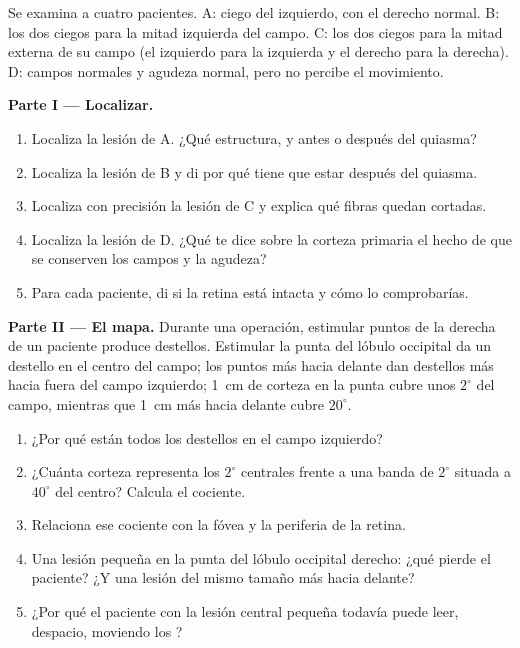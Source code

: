 \begin{problem}
\label{pb:g11:vision-and-brain:1}
Se examina a cuatro pacientes. A: ciego del  izquierdo, con el
derecho normal. B: los dos  ciegos para la mitad izquierda del
campo. C: los dos  ciegos para la mitad externa de su campo (el 
izquierdo para la izquierda y el derecho para la derecha). D: campos
normales y agudeza normal, pero no percibe el movimiento.

\medskip
\noindent\textbf{Parte I --- Localizar.}
\begin{enumerate}
  \item Localiza la lesión de A. ¿Qué estructura, y antes o después del
        quiasma?
  \item Localiza la lesión de B y di por qué tiene que estar después
        del quiasma.
  \item Localiza con precisión la lesión de C y explica qué fibras
        quedan cortadas.
  \item Localiza la lesión de D. ¿Qué te dice sobre la corteza primaria
        el hecho de que se conserven los campos y la agudeza?
  \item Para cada paciente, di si la retina está intacta y cómo lo
        comprobarías.
\end{enumerate}

\medskip
\noindent\textbf{Parte II --- El mapa.}
Durante una operación, estimular puntos de la  derecha de
un paciente produce destellos. Estimular la punta del lóbulo occipital
da un destello en el centro del campo; los puntos más hacia delante dan
destellos más hacia fuera del campo izquierdo; \qty{1}{cm} de corteza
en la punta cubre unos $2^\circ$ del campo, mientras que \qty{1}{cm}
más hacia delante cubre $20^\circ$.
\begin{enumerate}[resume]
  \item ¿Por qué están todos los destellos en el campo izquierdo?
  \item ¿Cuánta corteza representa los $2^\circ$ centrales frente a una
        banda de $2^\circ$ situada a $40^\circ$ del centro? Calcula el
        cociente.
  \item Relaciona ese cociente con la fóvea y la periferia de la
        retina.
  \item Una lesión pequeña en la punta del lóbulo occipital derecho:
        ¿qué pierde el paciente? ¿Y una lesión del mismo tamaño más
        hacia delante?
  \item ¿Por qué el paciente con la lesión central pequeña todavía
        puede leer, despacio, moviendo los ?
\end{enumerate}


\end{problem}
